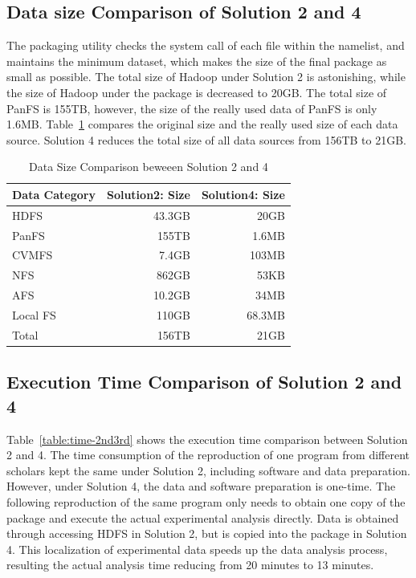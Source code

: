 \documentclass{acm_proc_article-sp}
\begin{document}
\subsection{ Data size Comparison of Solution 2 and 4}

The packaging utility checks the system call of each file within the namelist,
and maintains the minimum dataset, which makes the size of the final package 
as small as possible. The total size of Hadoop under Solution 2 is astonishing,
while the size of Hadoop under the package is decreased to 20GB. 
The total size of PanFS is 155TB, however, the size of the really used data of PanFS is only 1.6MB.
Table~\ref{table:datasize-2nd3rd} compares the original size and the really used size of each data source.
Solution 4 reduces the total size of all data sources from 156TB to 21GB.

\begin{table}
    \centering
    \begin{tabular}{|l|r|r|}
    \hline
     Data Category & Solution2: Size & Solution4: Size \\ \hline
    HDFS & 43.3GB & 20GB \\ \hline
    PanFS & 155TB & 1.6MB \\ \hline
    CVMFS & 7.4GB &103MB \\ \hline
    NFS & 862GB &53KB \\ \hline
    AFS & 10.2GB &34MB \\ \hline
    Local FS& 110GB&68.3MB \\ \hline
    Total & 156TB &21GB \\ \hline
    \end{tabular}
    \caption{Data Size Comparison beweeen Solution 2 and 4}
    \label{table:datasize-2nd3rd}
\end{table}

\subsection{Execution Time Comparison of Solution 2 and 4}

Table~\ref{table:time-2nd3rd} shows the execution time comparison between
Solution 2 and 4. The time consumption of the reproduction of one program from
different scholars kept the same under Solution 2, including software and data
preparation. However, under Solution 4, the data and software preparation is
one-time. The following reproduction of the same program only needs to obtain
one copy of the package and execute the actual experimental analysis directly.
Data is obtained through accessing HDFS in Solution 2, but is copied into the package in Solution 4. This localization of experimental data speeds up the data analysis process, resulting the actual analysis time reducing from 20 minutes to 13 minutes.
\end{document}
